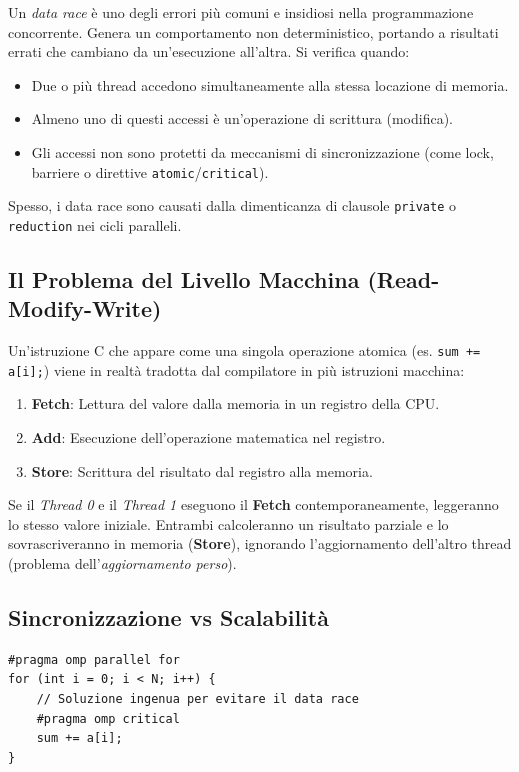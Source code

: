 Un \textit{data race} è uno degli errori più comuni e insidiosi nella programmazione concorrente. Genera un comportamento non deterministico, portando a risultati errati che cambiano da un'esecuzione all'altra. Si verifica quando:
\begin{itemize}
    \item Due o più thread accedono simultaneamente alla stessa locazione di memoria.
    \item Almeno uno di questi accessi è un'operazione di scrittura (modifica).
    \item Gli accessi non sono protetti da meccanismi di sincronizzazione (come lock, barriere o direttive \texttt{atomic}/\texttt{critical}).
\end{itemize}
Spesso, i data race sono causati dalla dimenticanza di clausole \texttt{private} o \texttt{reduction} nei cicli paralleli.

\subsection{Il Problema del Livello Macchina (Read-Modify-Write)}
Un'istruzione C che appare come una singola operazione atomica (es. \texttt{sum += a[i];}) viene in realtà tradotta dal compilatore in più istruzioni macchina:
\begin{enumerate}
    \item \textbf{Fetch}: Lettura del valore dalla memoria in un registro della CPU.
    \item \textbf{Add}: Esecuzione dell'operazione matematica nel registro.
    \item \textbf{Store}: Scrittura del risultato dal registro alla memoria.
\end{enumerate}

Se il \textit{Thread 0} e il \textit{Thread 1} eseguono il \textbf{Fetch} contemporaneamente, leggeranno lo stesso valore iniziale. Entrambi calcoleranno un risultato parziale e lo sovrascriveranno in memoria (\textbf{Store}), ignorando l'aggiornamento dell'altro thread (problema dell'\textit{aggiornamento perso}).

\subsection{Sincronizzazione vs Scalabilità}
\begin{verbatim}
#pragma omp parallel for
for (int i = 0; i < N; i++) {
    // Soluzione ingenua per evitare il data race
    #pragma omp critical
    sum += a[i];
}
\end{verbatim}


